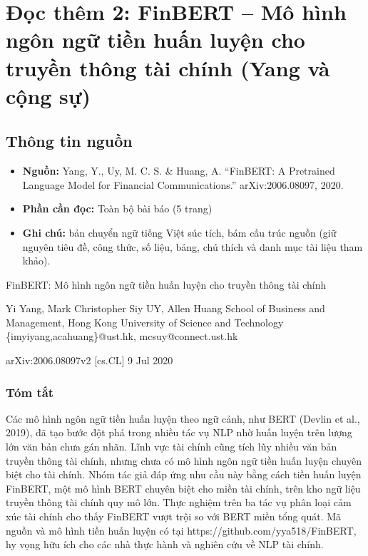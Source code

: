 \chapter{Đọc thêm 2: FinBERT -- Mô hình ngôn ngữ tiền huấn luyện cho truyền thông tài chính (Yang và cộng sự)}
\label{ch:M5L2DocThem2}

\section{Thông tin nguồn}

\begin{itemize}
  \item \textbf{Nguồn:} Yang, Y., Uy, M. C. S. \& Huang, A. ``FinBERT: A Pretrained Language Model for Financial Communications.'' arXiv:2006.08097, 2020.
  \item \textbf{Phần cần đọc:} Toàn bộ bài báo (5 trang)
  \item \textbf{Ghi chú:} bản chuyển ngữ tiếng Việt súc tích, bám cấu trúc nguồn (giữ nguyên tiêu đề, công thức, số liệu, bảng, chú thích và danh mục tài liệu tham khảo).
\end{itemize}

FinBERT: Mô hình ngôn ngữ tiền huấn luyện cho truyền thông tài chính

Yi Yang, Mark Christopher Siy UY, Allen Huang School of Business and Management, Hong Kong University of Science and Technology \{imyiyang,acahuang\}@ust.hk, mcsuy@connect.ust.hk

arXiv:2006.08097v2 {[}cs.CL{]} 9 Jul 2020

\subsection{Tóm tắt}

Các mô hình ngôn ngữ tiền huấn luyện theo ngữ cảnh, như BERT (Devlin et al., 2019), đã tạo bước đột phá trong nhiều tác vụ NLP nhờ huấn luyện trên lượng lớn văn bản chưa gán nhãn. Lĩnh vực tài chính cũng tích lũy nhiều văn bản truyền thông tài chính, nhưng chưa có mô hình ngôn ngữ tiền huấn luyện chuyên biệt cho tài chính. Nhóm tác giả đáp ứng nhu cầu này bằng cách tiền huấn luyện FinBERT, một mô hình BERT chuyên biệt cho miền tài chính, trên kho ngữ liệu truyền thông tài chính quy mô lớn. Thực nghiệm trên ba tác vụ phân loại cảm xúc tài chính cho thấy FinBERT vượt trội so với BERT miền tổng quát. Mã nguồn và mô hình tiền huấn luyện có tại https://github.com/yya518/FinBERT, hy vọng hữu ích cho các nhà thực hành và nghiên cứu về NLP tài chính.

